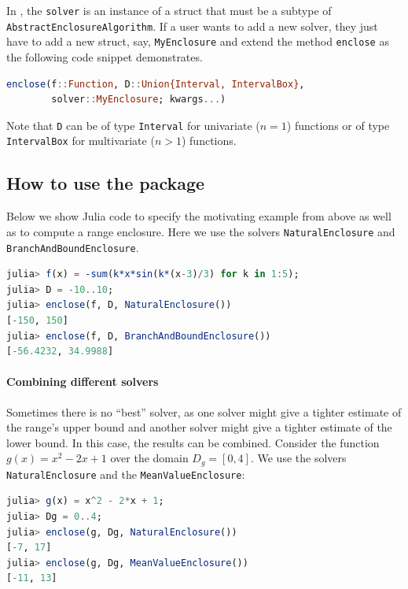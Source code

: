 \documentclass{juliacon}
\begin{document}
In \emph{\RE}, the \texttt{solver} is an instance of a struct that must be a subtype of \texttt{AbstractEnclosureAlgorithm}.
If a user wants to add a new solver, they just have to add a new struct, say, \texttt{MyEnclosure} and extend the method \texttt{enclose} as the following code snippet demonstrates.
%
\begin{lstlisting}[language=Julia]
enclose(f::Function, D::Union{Interval, IntervalBox},
        solver::MyEnclosure; kwargs...)
\end{lstlisting}

Note that \texttt{D} can be of type \texttt{Interval} for univariate ($n = 1$) functions or of type \texttt{IntervalBox} for multivariate ($n > 1$) functions.


\subsection{How to use the package}

Below we show Julia code to specify the motivating example from above as well as to compute a range enclosure. Here we use the solvers \texttt{NaturalEnclosure} and \texttt{BranchAndBoundEnclosure}.

\begin{lstlisting}[language=Julia]
julia> f(x) = -sum(k*x*sin(k*(x-3)/3) for k in 1:5);
julia> D = -10..10;
julia> enclose(f, D, NaturalEnclosure())
[-150, 150]
julia> enclose(f, D, BranchAndBoundEnclosure())
[-56.4232, 34.9988]
\end{lstlisting}


\paragraph*{Combining different solvers}

Sometimes there is no ``best'' solver, as one solver might give a tighter estimate of the range's upper bound and another solver might give a tighter estimate of the lower bound. In this case, the results can be combined. Consider the function $g(x) = x^2 - 2x + 1$ over the domain $D_g = [0, 4]$. We use the solvers \texttt{NaturalEnclosure} and the \texttt{MeanValueEnclosure}:

\begin{lstlisting}[language=Julia]
julia> g(x) = x^2 - 2*x + 1;
julia> Dg = 0..4;
julia> enclose(g, Dg, NaturalEnclosure())
[-7, 17]
julia> enclose(g, Dg, MeanValueEnclosure())
[-11, 13]
\end{lstlisting}
\end{document}
